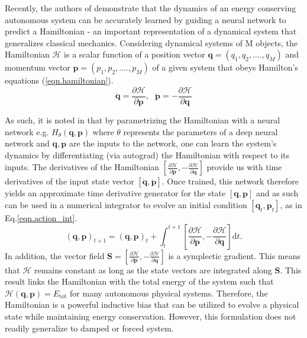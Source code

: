 \documentclass{article}
\begin{document}
Recently, the authors of \cite{greydanus_hamiltonian_2019} demonstrate that the dynamics of an energy conserving autonomous system can be accurately learned by guiding a neural network to predict a Hamiltonian - an important representation of a dynamical system that generalizes classical mechanics. Considering dynamical systems of M objects, the Hamiltonian $\mathcal{H}$ is a scalar function of a position vector $\mathbf{q} = (q_1,q_2,....,q_M)$ and momentum vector $\mathbf{p} = (p_1,p_2,....,p_M)$ of a given system that obeys Hamilton's equations (\ref{eqn.hamiltonian}).
\begin{equation}
\dot{\mathbf{q}}= \frac{\partial \mathcal{H}}{\partial \mathbf{p}}, ~~~
\dot{\mathbf{p}}= -\frac{\partial \mathcal{H}}{\partial \mathbf{q}}
\label{eqn.hamiltonian}
\end{equation}

As such, it is noted in \cite{greydanus_hamiltonian_2019} that by parametrizing the Hamiltonian with a neural network e.g. $H_{\theta}(\mathbf{q},\mathbf{p})$ where $\theta$ represents the parameters of a deep neural network and $\mathbf{q},\mathbf{p}$ are the inputs to the network, one can learn the system's dynamics by differentiating (via autograd) the Hamiltonian with respect to its inputs. The derivatives of the Hamiltonian $\left [ \frac{\partial \mathcal{H}}{\partial \mathbf{p}},-\frac{\partial \mathcal{H}}{\partial \mathbf{q}} \right ]$ provide us with time derivatives of the input state vector $[\dot{\mathbf{q}},\dot{\mathbf{p}}]$. Once trained, this network therefore yields an approximate time derivative generator for the state $[\mathbf{q},\mathbf{p}]$ and as such can be used in a numerical integrator to evolve an initial condition $[\mathbf{q}_t,\mathbf{p}_t]$, as in Eq.\ref{eqn.action_int}.
\begin{equation}
(\mathbf{q},\mathbf{p})_{t+1} = (\mathbf{q},\mathbf{p})_t + \int_t^{t+1} \left [ \frac{\partial \mathcal{H}}{\partial \mathbf{p}},-\frac{\partial \mathcal{H}}{\partial \mathbf{q}} \right ] \mathrm{d}t.
\label{eqn.action_int}
\end{equation}
In addition, the vector field $\mathbf{S} = \left [ \frac{\partial \mathcal{H}}{\partial \mathbf{p}},-\frac{\partial \mathcal{H}}{\partial \mathbf{q}} \right ]$ is a symplectic gradient. This means that $\mathcal{H}$ remains constant as long as the state vectors are integrated along $\mathbf{S}$. This result links the Hamiltonian with the total energy of the system such that $\mathcal{H}(\mathbf{q},\mathbf{p}) = E_{\mathrm{tot}}$ for many autonomous physical systems. Therefore, the Hamiltonian is a powerful inductive bias that can be utilized to evolve a physical state while maintaining energy conservation. However, this formulation does not readily generalize to damped or forced system.
\end{document}
